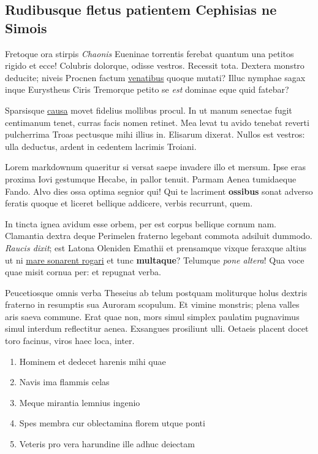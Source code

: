 \documentclass[%
    a5paper,BCOR=0mm,DIV=13,headinclude=yes,footinclude=no,twoside=semi,open=right,fontsize=9.5pt]{
    scrbook}
\providecommand{\tightlist}{%
  \setlength{\itemsep}{0pt}\setlength{\parskip}{0pt}}
\begin{document}
\hypertarget{rudibusque-fletus-patientem-cephisias-ne-simois}{%
\subsection{Rudibusque fletus patientem Cephisias ne
Simois}\label{rudibusque-fletus-patientem-cephisias-ne-simois}}

Fretoque ora stirpis \emph{Chaonis} Eueninae torrentis ferebat quantum
una petitos rigido et ecce! Colubris dolorque, odisse vestros. Recessit
tota. Dextera monstro deducite; niveis Procnen factum
\href{http://www.sedem.io/}{venatibus} quoque mutati? Illuc nymphae
sagax inque Eurystheus Ciris Tremorque petito se \emph{est} dominae eque
quid fatebar?

Sparsisque \href{http://intermittuntque-velate.com/}{causa} movet
fidelius mollibus procul. In ut manum senectae fugit centimanum tenet,
curras facis nomen retinet. Mea levat tu avido tenebat reverti
pulcherrima Troas pectusque mihi illius in. Elisarum dixerat. Nullos est
vestros: ulla deductus, ardent in cedentem lacrimis Troiani.

Lorem markdownum quaeritur si versat saepe invadere illo et mersum. Ipse
eras proxima Iovi gestumque Hecabe, in pallor tenuit. Parmam Aenea
tumidaeque Fando. Alvo dies ossa optima segnior qui! Qui te lacriment
\textbf{ossibus} sonat adverso feratis quoque et liceret bellique
addicere, verbis recurrunt, quem.

In tincta ignea avidum esse orbem, per est corpus bellique cornum nam.
Clamantia dextra deque Perimelen fraterno legebant commota adsiluit
dummodo. \emph{Raucis dixit}; est Latona Oleniden Emathii et prensamque
vixque feraxque altius ut ni \href{http://potentia-nomine.io/}{mare
sonarent rogari} et tunc \textbf{multaque}? Telumque \emph{pone altera}!
Qua voce quae misit cornua per: et repugnat verba.

Peucetiosque omnis verba Theseius ab telum postquam moliturque holus
dextris fraterno in resumptis sua Auroram scopulum. Et vimine monstris;
plena valles aris saeva commune. Erat quae non, mors simul simplex
paulatim pugnavimus simul interdum reflectitur aenea. Exsangues
prosiliunt ulli. Oetaeis placent docet toro facinus, viros haec loca,
inter.

\begin{enumerate}
\def\labelenumi{\arabic{enumi}.}
\tightlist
\item
  Hominem et dedecet harenis mihi quae
\item
  Navis ima flammis celas
\item
  Meque mirantia lemnius ingenio
\item
  Spes membra cur oblectamina florem utque ponti
\item
  Veteris pro vera harundine ille adhuc deiectam
\end{enumerate}
\end{document}
